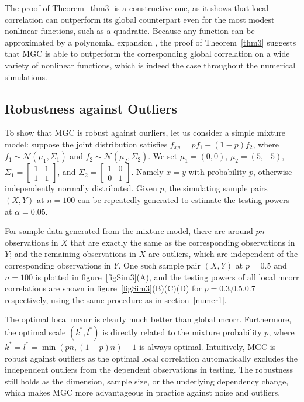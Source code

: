 \documentclass[11pt]{article}
\providecommand{\mc}[1]{\mathcal{#1}}
\begin{document}
The proof of Theorem~\ref{thm3} is a constructive one, as it shows that local correlation can outperform its global counterpart even for the most modest nonlinear functions, such as a quadratic.  Because any function can be approximated by a polynomial expansion \cite{RudinBook}, the proof of Theorem~\ref{thm3} suggests that MGC is able to outperform the corresponding global correlation on a wide variety of nonlinear functions, which is indeed the case throughout the numerical simulations.


\subsection{Robustness against Outliers}
\label{main4}
To show that MGC is robust against ourliers, let us consider a simple mixture model: suppose the joint distribution satisfies $f_{xy}=p f_{1}+(1-p) f_{2}$, where $f_{1} \sim \mc{N}(\mu_{1},\Sigma_{1})$ and $f_{2} \sim \mc{N}(\mu_{2},\Sigma_{2})$. We set $\mu_{1}=(0,0)$, $\mu_{2}=(5,-5)$, $\Sigma_{1} = \begin{bmatrix} 1&1\\ 1&1 \end{bmatrix}$, and $\Sigma_{2} = \begin{bmatrix} 1&0\\ 0&1 \end{bmatrix}$. Namely $x=y$ with probability $p$, otherwise independently normally distributed. Given $p$, the simulating sample pairs $(X,Y)$ at $n=100$ can be repeatedly generated to estimate the testing powers at $\alpha=0.05$. 

For sample data generated from the mixture model, there are around $pn$ observations in $X$ that are exactly the same as the corresponding observations in $Y$; and the remaining observations in $X$ are outliers, which are independent of the corresponding observations in $Y$. One such sample pair $(X,Y)$ at $p=0.5$ and $n=100$ is plotted in figure~\ref{figSim3}(A), and the testing powers of all local mcorr correlations are shown in figure~\ref{figSim3}(B)(C)(D) for $p=0.3$,$0.5$,$0.7$ respectively, using the same procedure as in section~\ref{numer1}.

The optimal local mcorr is clearly much better than global mcorr. Furthermore, the optimal scale $(k^{*},l^{*})$ is directly related to the mixture probability $p$, where $k^{*}=l^{*}=\min(pn,(1-p)n)-1$ is always optimal. Intuitively, MGC is robust against outliers as the optimal local correlation automatically excludes the independent outliers from the dependent observations in testing. The robustness still holds as the dimension, sample size, or the underlying dependency change, which makes MGC more advantageous in practice against noise and outliers. 
\end{document}
